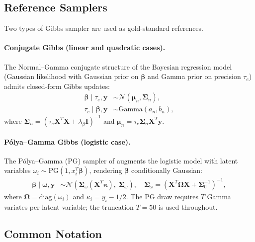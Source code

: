 \documentclass[11pt,a4paper]{article}
\newcommand{\N}{\mathcal{N}}
\begin{document}
\subsection{Reference Samplers}

Two types of Gibbs sampler are used as gold-standard references.

\paragraph{Conjugate Gibbs (linear and quadratic cases).}
The Normal--Gamma conjugate structure of the Bayesian regression model (Gaussian
likelihood with Gaussian prior on $\bm{\beta}$ and Gamma prior on precision $\tau_e$)
admits closed-form Gibbs updates:
\begin{align}
  \bm{\beta} \mid \tau_e, \bm{y} &\sim \N(\bm{\mu}_n, \bm{\Sigma}_n), \\
  \tau_e \mid \bm{\beta}, \bm{y} &\sim \mathrm{Gamma}(a_n, b_n),
\end{align}
where $\bm{\Sigma}_n = (\tau_e\bm{X}^T\bm{X} + \lambda_\beta\bm{I})^{-1}$ and
$\bm{\mu}_n = \tau_e\bm{\Sigma}_n\bm{X}^T\bm{y}$.

\paragraph{P\'{o}lya--Gamma Gibbs (logistic case).}
The P\'{o}lya--Gamma (PG) sampler of \textcite{Polson2013} augments the logistic model
with latent variables $\omega_i \sim \mathrm{PG}(1, x_i^T\bm{\beta})$, rendering
$\bm{\beta}$ conditionally Gaussian:
\begin{align}
  \bm{\beta} \mid \bm{\omega}, \bm{y}
    &\sim \N\!\left(\bm{\Sigma}_\omega(\bm{X}^T\bm{\kappa}),\; \bm{\Sigma}_\omega\right),
  \quad \bm{\Sigma}_\omega = (\bm{X}^T\bm{\Omega}\bm{X} + \bm{\Sigma}_0^{-1})^{-1},
\end{align}
where $\bm{\Omega} = \mathrm{diag}(\omega_i)$ and $\kappa_i = y_i - 1/2$.
The PG draw requires $T$ Gamma variates per latent variable; the truncation $T=50$
is used throughout.

\subsection{Common Notation}
\end{document}
